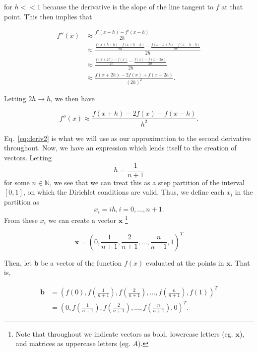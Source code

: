 \documentclass[12pt]{article}
\numberwithin{equation}{section}
\begin{document}
\noindent for $h<<1$ because the derivative is the slope of the line tangent to $f$ at that point.  This then implies that

\begin{equation}
\begin{align}
f''\left(x\right)&\approx\frac{f'\left(x+h\right)-f'\left(x-h\right)}{2h} \\
&\approx\frac{\frac{f\left(x+h+h\right)-f\left(x+h-h\right)}{2h} - \frac{f\left(x-h+h\right)-f\left(x-h-h\right)}{2h}}{2h} \\
&\approx\frac{\frac{f\left(x+2h\right)-f\left(x\right)}{2h} - \frac{f\left(x\right)-f\left(x-2h\right)}{2h}}{2h} \\
&\approx\frac{f\left(x+2h\right)-2f\left(x\right)+f\left(x-2h\right)}{\left(2h\right)^{2}}.
\end{align}
\end{equation}

\noindent Letting $2h\rightarrow h$, we then have

\begin{equation}
\label{eq:deriv2}
f''\left(x\right)\approx\frac{f\left(x+h\right)-2f\left(x\right)+f\left(x-h\right)}{h^{2}}.
\end{equation}

\noindent Eq.~\ref{eq:deriv2} is what we will use as our approximation to the second derivative throughout.  
\indent Now, we have an expression which lends itself to the creation of vectors.  Letting $$h = \frac{1}{n+1}$$ for some $n\in\mathbb{N}$, we see that we can treat this as a step partition of the interval $\left[0,1\right]$, on which the Dirichlet conditions are valid.  Thus, we define each $x_{i}$ in the partition as $$x_{i}=ih,i=0,\ldots,n+1.$$  From these $x_{i}$ we can create a vector $\textbf{x}$ \footnote{Note that throughout we indicate vectors as bold, lowercase letters (eg. $\textbf{x}$), and matrices as uppercase letters (eg. $A$).}

\begin{equation}
\textbf{x} = \left(0,\frac{1}{n+1},\frac{2}{n+1},\ldots,\frac{n}{n+1},1\right)^{T}
\end{equation}

\noindent Then, let $\textbf{b}$ be a vector of the function $f\left(x\right)$ evaluated at the points in $\textbf{x}$.  That is,

\begin{equation}
\begin{align}
\textbf{b} &= \left(f\left(0\right),f\left(\frac{1}{n+1}\right),f\left(\frac{2}{n+1}\right),\ldots,f\left(\frac{n}{n+1}\right),f\left(1\right)\right)^{T} \\
&= \left(0,f\left(\frac{1}{n+1}\right),f\left(\frac{2}{n+1}\right),\ldots,f\left(\frac{n}{n+1}\right),0\right)^{T}.
\end{align}
\end{equation}
\end{document}
